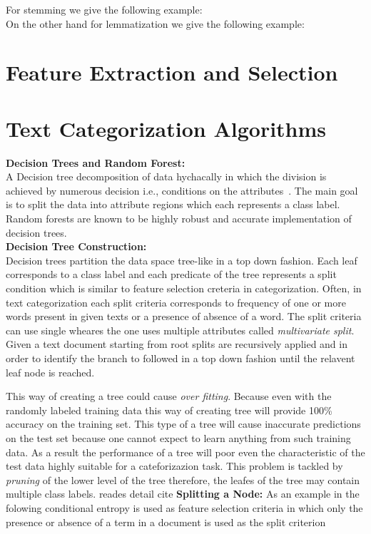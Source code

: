 For stemming we give the following example:\\

On the other hand for lemmatization we give the following example:\\

\section{Feature Extraction and Selection}


\section{Text Categorization Algorithms}
\textbf{Decision Trees and Random Forest:}\\
A Decision tree decomposition of data hychacally in which the division is achieved by numerous decision i.e., conditions on the attributes~\cite{book}. The main goal is to split the data into attribute regions which each represents a class label. Random forests are known to be highly robust and accurate implementation of decision trees. \\
\textbf{Decision Tree Construction:}\\
Decision trees partition the data space tree-like in a top down fashion. Each leaf corresponds to a class label and each predicate of the tree represents a split condition which is similar to feature selection creteria in categorization. Often, in text categorization each split criteria corresponds to frequency of one or more words present in given texts or a presence of absence of a word. The split criteria can use single wheares the one uses multiple attributes called \textit{multivariate split}.
Given a text document starting from root splits are recursively applied and in order to identify the branch to followed in a top down fashion until the relavent leaf node is reached. 

This way of creating a tree could cause \textit{over fitting}. Because even with the randomly labeled training data this way of creating tree will provide 100\% accuracy on the training set. This type of a tree will cause inaccurate predictions on the test set because one cannot expect to learn anything from such training data. As a result the performance of a tree will poor even the characteristic of the test data highly suitable for a cateforizazion task. This problem is tackled by \textit{pruning} of the lower level of the tree therefore, the leafes of the tree may contain multiple class labels. reades detail cite
\textbf{Splitting a Node:}
As an example in the folowing conditional entropy is used as feature selection criteria in which  only the presence or absence of a term in a document is used as the split criterion

